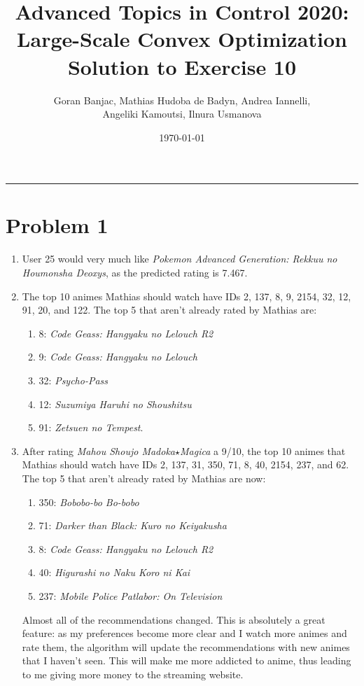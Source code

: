 \documentclass[11pt,a4paper]{article}
\title{%
    \textbf{Advanced Topics in Control 2020: \\ Large-Scale Convex Optimization} \\[.5em]
    Solution to Exercise 10
}
\author{Goran Banjac, Mathias Hudoba de Badyn, Andrea Iannelli, \\ Angeliki Kamoutsi, Ilnura Usmanova}
\date{\today}
\begin{document}
\maketitle
\hrule
\vspace{0.3cm}




\section{Problem 1}

\begin{enumerate}
  \item User 25 would very much like \textit{Pokemon Advanced Generation: Rekkuu no Houmonsha Deoxys}, as the predicted rating is 7.467.
  \item The top 10 animes Mathias should watch have IDs            2,
         137,
           8,
           9,
        2154,
          32,
          12,
          91,
          20, and
         122.
         The top 5 that aren't already rated by Mathias are:
    \begin{enumerate}
      \item 8: \emph{Code Geass: Hangyaku no Lelouch R2}
      \item 9: \emph{Code Geass: Hangyaku no Lelouch}
      \item 32: \emph{Psycho-Pass}
      \item 12: \emph{Suzumiya Haruhi no Shoushitsu}
      \item 91: \emph{Zetsuen no Tempest}.
    \end{enumerate}
  \item After rating \emph{Mahou Shoujo Madoka$\star$Magica} a 9/10, the top 10 animes that Mathias should watch have IDs            2,
         137,
          31,
         350,
          71,
           8,
          40,
        2154,
         237, and
          62.
          The top 5 that aren't already rated by Mathias are now:
\begin{enumerate}
  \item 350: \emph{Bobobo-bo Bo-bobo}
  \item 71: \emph{Darker than Black: Kuro no Keiyakusha}
  \item 8: \emph{Code Geass: Hangyaku no Lelouch R2}
  \item 40: \emph{Higurashi no Naku Koro ni Kai}
  \item 237: \emph{Mobile Police Patlabor: On Television}
\end{enumerate}
Almost all of the recommendations changed.
This is absolutely a great feature: as my preferences become more clear and I watch more animes and rate them, the algorithm will update the recommendations with new animes that I haven't seen. 
This will make me more addicted to anime, thus leading to me giving more money to the streaming website.


\end{enumerate}
\end{document}
